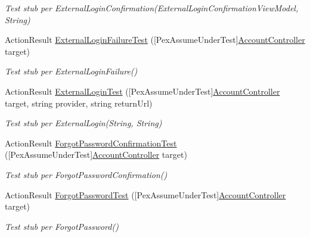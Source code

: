 \begin{DoxyCompactItemize}
\begin{DoxyCompactList}\small\item\em Test stub per External\+Login\+Confirmation(\+External\+Login\+Confirmation\+View\+Model, String)\end{DoxyCompactList}\item 
Action\+Result \mbox{\hyperlink{class_brew_day2_1_1_controllers_1_1_testsn_1_1_account_controller_test_a0f3fe5d1de5b1fb204f5060eec578575}{External\+Login\+Failure\+Test}} (\mbox{[}Pex\+Assume\+Under\+Test\mbox{]}\mbox{\hyperlink{class_brew_day2_1_1_controllers_1_1_account_controller}{Account\+Controller}} target)
\begin{DoxyCompactList}\small\item\em Test stub per External\+Login\+Failure()\end{DoxyCompactList}\item 
Action\+Result \mbox{\hyperlink{class_brew_day2_1_1_controllers_1_1_testsn_1_1_account_controller_test_afc23597a75028c19a344bfd1a5408b90}{External\+Login\+Test}} (\mbox{[}Pex\+Assume\+Under\+Test\mbox{]}\mbox{\hyperlink{class_brew_day2_1_1_controllers_1_1_account_controller}{Account\+Controller}} target, string provider, string return\+Url)
\begin{DoxyCompactList}\small\item\em Test stub per External\+Login(\+String, String)\end{DoxyCompactList}\item 
Action\+Result \mbox{\hyperlink{class_brew_day2_1_1_controllers_1_1_testsn_1_1_account_controller_test_aa029eb32bbb5dcd9ce5e6a7ecb150c4e}{Forgot\+Password\+Confirmation\+Test}} (\mbox{[}Pex\+Assume\+Under\+Test\mbox{]}\mbox{\hyperlink{class_brew_day2_1_1_controllers_1_1_account_controller}{Account\+Controller}} target)
\begin{DoxyCompactList}\small\item\em Test stub per Forgot\+Password\+Confirmation()\end{DoxyCompactList}\item 
Action\+Result \mbox{\hyperlink{class_brew_day2_1_1_controllers_1_1_testsn_1_1_account_controller_test_af65e3430fbf102940344739d7b4e7904}{Forgot\+Password\+Test}} (\mbox{[}Pex\+Assume\+Under\+Test\mbox{]}\mbox{\hyperlink{class_brew_day2_1_1_controllers_1_1_account_controller}{Account\+Controller}} target)
\begin{DoxyCompactList}\small\item\em Test stub per Forgot\+Password()\end{DoxyCompactList}\item 

\end{DoxyCompactItemize}
